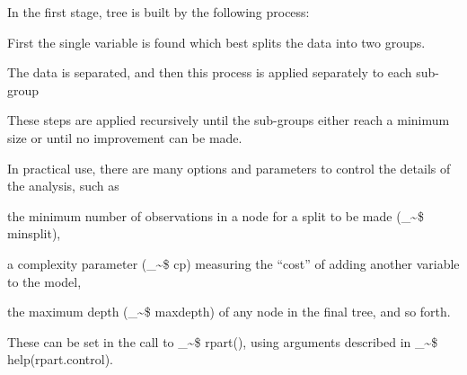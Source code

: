 \documentclass{article}
\makeatletter
\newcommand\code{\bgroup\@makeother\_\@makeother\~\@makeother\$\@codex}
\def\@codex#1{{\normalfont\ttfamily\hyphenchar\font=-1 #1}\egroup}
\newcommand{\func}[1]{\code{#1()}}
\makeatother
\begin{document}
In the first stage, tree is built by the following process: 
\begin{itemize*}
  \item First the single variable is found which best splits the data into two groups.
  \item The data is separated, and then this process is applied separately to each sub-group
  \item These steps are applied recursively until the sub-groups either reach a minimum size or until no improvement can be
made.
\end{itemize*}

In practical use, there are many options and parameters to control the details of the analysis, such as 
\begin{itemize*}
  \item the minimum number of observations in a node for a split to be made (\code{minsplit}), 
  \item a complexity parameter (\code{cp}) measuring the ``cost'' of adding another variable to the model, 
  \item the maximum depth (\code{maxdepth}) of any node in the final tree, and so forth. 
\end{itemize*}
These can be set in the call to \func{rpart}, using arguments described in \code{help(rpart.control)}. 
\end{document}
